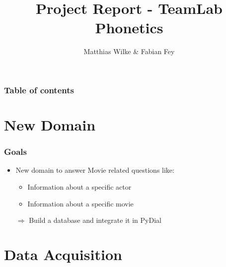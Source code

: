\documentclass[11pt]{beamer}
\begin{document}
	\author{Matthias Wilke \& Fabian Fey}
	\title{Project Report - TeamLab Phonetics}
	
\begin{frame}[plain]
	\maketitle
\end{frame}


\begin{frame}
	\frametitle{Table of contents}
	\tableofcontents[hideallsubsections]
\end{frame}


\section{New Domain}
\begin{frame}
	\frametitle{Goals}
	\begin{itemize}
		\item New domain to answer Movie related questions like: \pause
		\begin{itemize}
			\item Information about a specific actor \pause
			\item Information about a specific movie \pause
		\end{itemize}
		\item[$\Rightarrow$] Build a database and integrate it in PyDial
	\end{itemize}
\end{frame}

\section{Data Acquisition}
\end{document}

